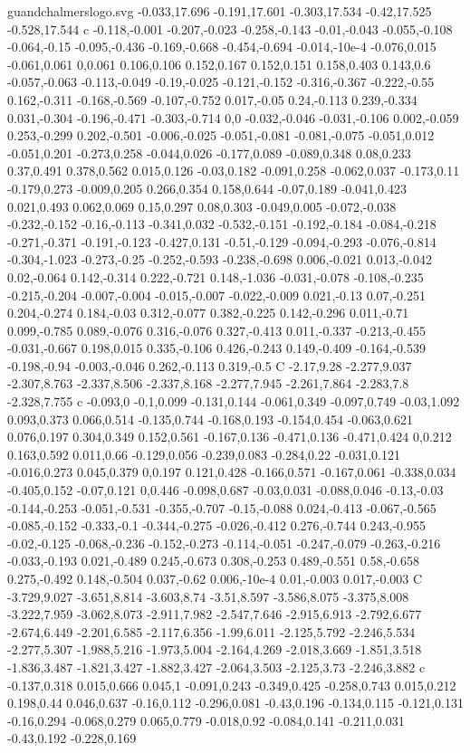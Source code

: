 \begin{filecontents}[noheader]{guandchalmerslogo.svg}
-0.033,17.696 -0.191,17.601 -0.303,17.534 -0.42,17.525 -0.528,17.544 c -0.118,-0.001 -0.207,-0.023 -0.258,-0.143 -0.01,-0.043 -0.055,-0.108 -0.064,-0.15 -0.095,-0.436 -0.169,-0.668 -0.454,-0.694 -0.014,-10e-4 -0.076,0.015 -0.061,0.061 0,0.061 0.106,0.106 0.152,0.167 0.152,0.151 0.158,0.403 0.143,0.6 -0.057,-0.063 -0.113,-0.049 -0.19,-0.025 -0.121,-0.152 -0.316,-0.367 -0.222,-0.55 0.162,-0.311 -0.168,-0.569 -0.107,-0.752 0.017,-0.05 0.24,-0.113 0.239,-0.334 0.031,-0.304 -0.196,-0.471 -0.303,-0.714 0,0 -0.032,-0.046 -0.031,-0.106 0.002,-0.059 0.253,-0.299 0.202,-0.501 -0.006,-0.025 -0.051,-0.081 -0.081,-0.075 -0.051,0.012 -0.051,0.201 -0.273,0.258 -0.044,0.026 -0.177,0.089 -0.089,0.348 0.08,0.233 0.37,0.491 0.378,0.562 0.015,0.126 -0.03,0.182 -0.091,0.258 -0.062,0.037 -0.173,0.11 -0.179,0.273 -0.009,0.205 0.266,0.354 0.158,0.644 -0.07,0.189 -0.041,0.423 0.021,0.493 0.062,0.069 0.15,0.297 0.08,0.303 -0.049,0.005 -0.072,-0.038 -0.232,-0.152 -0.16,-0.113 -0.341,0.032 -0.532,-0.151 -0.192,-0.184 -0.084,-0.218 -0.271,-0.371 -0.191,-0.123 -0.427,0.131 -0.51,-0.129 -0.094,-0.293 -0.076,-0.814 -0.304,-1.023 -0.273,-0.25 -0.252,-0.593 -0.238,-0.698 0.006,-0.021 0.013,-0.042 0.02,-0.064 0.142,-0.314 0.222,-0.721 0.148,-1.036 -0.031,-0.078 -0.108,-0.235 -0.215,-0.204 -0.007,-0.004 -0.015,-0.007 -0.022,-0.009 0.021,-0.13 0.07,-0.251 0.204,-0.274 0.184,-0.03 0.312,-0.077 0.382,-0.225 0.142,-0.296 0.011,-0.71 0.099,-0.785 0.089,-0.076 0.316,-0.076 0.327,-0.413 0.011,-0.337 -0.213,-0.455 -0.031,-0.667 0.198,0.015 0.335,-0.106 0.426,-0.243 0.149,-0.409 -0.164,-0.539 -0.198,-0.94 -0.003,-0.046 0.262,-0.113 0.319,-0.5 C -2.17,9.28 -2.277,9.037 -2.307,8.763 -2.337,8.506 -2.337,8.168 -2.277,7.945 -2.261,7.864 -2.283,7.8 -2.328,7.755 c -0.093,0 -0.1,0.099 -0.131,0.144 -0.061,0.349 -0.097,0.749 -0.03,1.092 0.093,0.373 0.066,0.514 -0.135,0.744 -0.168,0.193 -0.154,0.454 -0.063,0.621 0.076,0.197 0.304,0.349 0.152,0.561 -0.167,0.136 -0.471,0.136 -0.471,0.424 0,0.212 0.163,0.592 0.011,0.66 -0.129,0.056 -0.239,0.083 -0.284,0.22 -0.031,0.121 -0.016,0.273 0.045,0.379 0,0.197 0.121,0.428 -0.166,0.571 -0.167,0.061 -0.338,0.034 -0.405,0.152 -0.07,0.121 0,0.446 -0.098,0.687 -0.03,0.031 -0.088,0.046 -0.13,-0.03 -0.144,-0.253 -0.051,-0.531 -0.355,-0.707 -0.15,-0.088 0.024,-0.413 -0.067,-0.565 -0.085,-0.152 -0.333,-0.1 -0.344,-0.275 -0.026,-0.412 0.276,-0.744 0.243,-0.955 -0.02,-0.125 -0.068,-0.236 -0.152,-0.273 -0.114,-0.051 -0.247,-0.079 -0.263,-0.216 -0.033,-0.193 0.021,-0.489 0.245,-0.673 0.308,-0.253 0.489,-0.551 0.58,-0.658 0.275,-0.492 0.148,-0.504 0.037,-0.62 0.006,-10e-4 0.01,-0.003 0.017,-0.003 C -3.729,9.027 -3.651,8.814 -3.603,8.74 -3.51,8.597 -3.586,8.075 -3.375,8.008 -3.222,7.959 -3.062,8.073 -2.911,7.982 -2.547,7.646 -2.915,6.913 -2.792,6.677 -2.674,6.449 -2.201,6.585 -2.117,6.356 -1.99,6.011 -2.125,5.792 -2.246,5.534 -2.277,5.307 -1.988,5.216 -1.973,5.004 -2.164,4.269 -2.018,3.669 -1.851,3.518 -1.836,3.487 -1.821,3.427 -1.882,3.427 -2.064,3.503 -2.125,3.73 -2.246,3.882 c -0.137,0.318 0.015,0.666 0.045,1 -0.091,0.243 -0.349,0.425 -0.258,0.743 0.015,0.212 0.198,0.44 0.046,0.637 -0.16,0.112 -0.296,0.081 -0.43,0.196 -0.134,0.115 -0.121,0.131 -0.16,0.294 -0.068,0.279 0.065,0.779 -0.018,0.92 -0.084,0.141 -0.211,0.031 -0.43,0.192 -0.228,0.169 
\end{filecontents}
